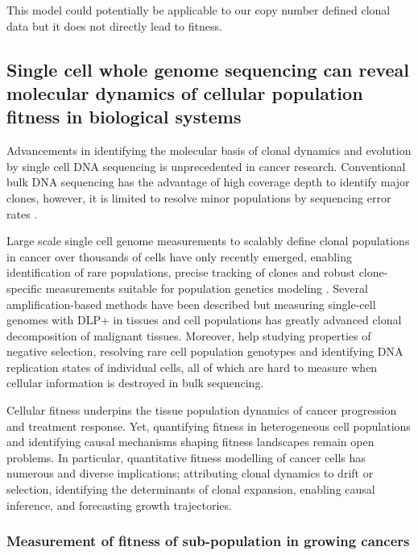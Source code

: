 This model could potentially be applicable to our copy number defined clonal data but it does not directly lead to fitness.



\subsection{Single cell whole genome sequencing can reveal molecular dynamics of cellular population fitness in biological systems}
Advancements in identifying the molecular basis of clonal dynamics and evolution by single cell DNA sequencing is unprecedented in cancer research. Conventional bulk DNA sequencing has the advantage of high coverage depth to identify major clones, however, it is limited to resolve minor populations by sequencing error rates \cite{gerstung2012reliable}. 

Large scale single cell genome measurements to scalably define clonal populations in cancer over thousands of cells have only recently emerged, enabling identification of rare populations, precise tracking of clones and robust clone-specific measurements suitable for population genetics modeling  \cite{laks2019clonal,zahn2017scalable}. Several amplification-based methods have been described \cite{navin2011tumour,zong2012genome, hou2012single,ni2013reproducible} but measuring single-cell genomes with \ac{DLP+} in tissues and cell populations has greatly advanced clonal decomposition of malignant tissues. 
Moreover, help studying properties of negative selection, resolving rare cell population genotypes and identifying DNA replication states of individual cells, all of which are hard to measure when cellular information is destroyed in bulk sequencing. 

Cellular fitness underpins the tissue population dynamics of cancer progression and treatment response. Yet, quantifying fitness in heterogeneous cell populations and identifying causal mechanisms shaping fitness landscapes remain open problems. In particular, quantitative fitness modelling of cancer cells has numerous and diverse implications; attributing clonal dynamics to drift or selection, identifying the determinants of clonal expansion, enabling causal inference, and forecasting growth trajectories. 

\subsubsection{Measurement of fitness of sub-population in growing cancers}

